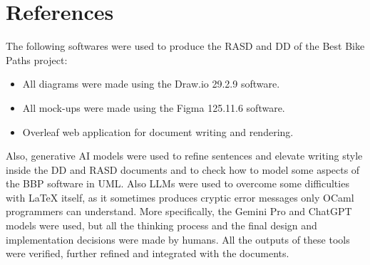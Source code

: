 \section{References}

The following softwares were used to produce the RASD and DD of the Best Bike Paths project: 
\begin{itemize}
    \item All diagrams were made using the Draw.io 29.2.9 software.
    \item All mock-ups were made using the Figma 125.11.6 software.
    \item Overleaf web application for document writing and rendering.
\end{itemize}

Also, generative AI models were used to refine sentences and elevate writing style inside the DD and RASD documents and to check how to model some aspects of the BBP software in UML. Also LLMs were used to overcome some difficulties with \LaTeX\hspace{1mm}  itself, as it sometimes produces cryptic error messages only OCaml programmers can understand. More specifically, the Gemini Pro and ChatGPT models were used, but all the thinking process and the final design and implementation decisions were made by humans. All the outputs of these tools were verified, further refined and integrated with the documents.

